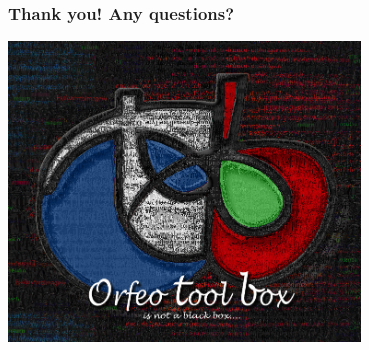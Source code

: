 \documentclass[8pt]{beamer}
\begin{document}
\begin{frame}
\frametitle{Thank you! Any questions?}
\begin{minipage}[t][6cm][t]{\textwidth}
\begin{center}
\includegraphics[width=0.7\textwidth]{images/LOGOTB_blackbox.png}
\end{center}
\end{minipage}
\end{frame}
\end{document}
